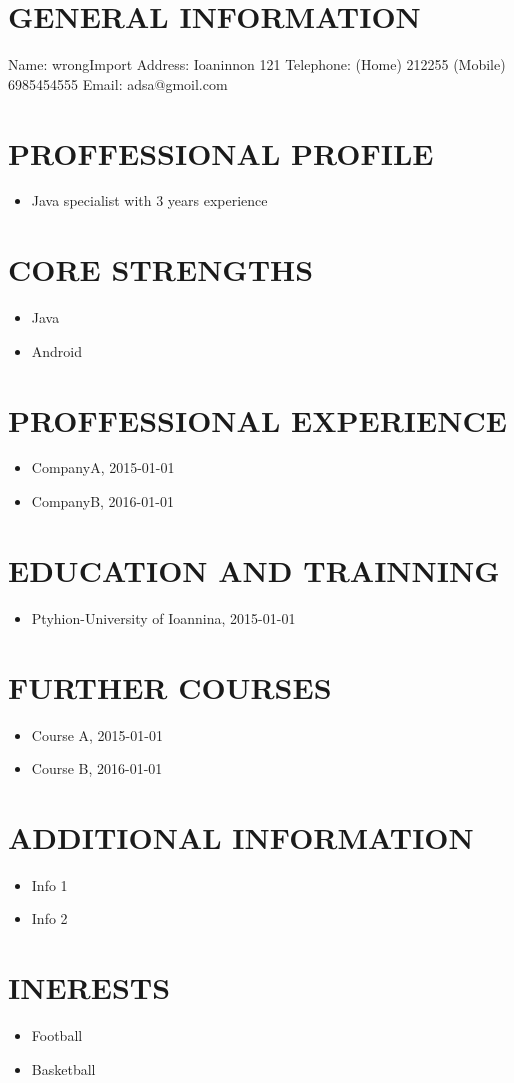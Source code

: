 \documentclass{article}
\begin{document}
 
\section{GENERAL INFORMATION}
Name: wrongImport
Address:  Ioaninnon 121
Telephone: (Home)  212255  (Mobile)  6985454555
Email:  adsa@gmoil.com
\section{PROFFESSIONAL PROFILE}
\begin{itemize}
\item Java specialist with 3 years experience
\end{itemize}
\section{CORE STRENGTHS}
\begin{itemize}
\item Java
\item Android
\end{itemize}
\section{PROFFESSIONAL EXPERIENCE}
\begin{itemize}
\item CompanyA, 2015-01-01
\item CompanyB, 2016-01-01
\end{itemize}
\section{EDUCATION AND TRAINNING}
\begin{itemize}
\item Ptyhion-University of Ioannina, 2015-01-01
\end{itemize}
\section{FURTHER COURSES}
\begin{itemize}
\item Course A, 2015-01-01
\item Course B, 2016-01-01
\end{itemize}
\section{ADDITIONAL INFORMATION}
\begin{itemize}
\item Info 1
\item Info 2
\end{itemize}
\section{INERESTS}
\begin{itemize}
\item Football
\item Basketball
\end{itemize}
\end{document}
